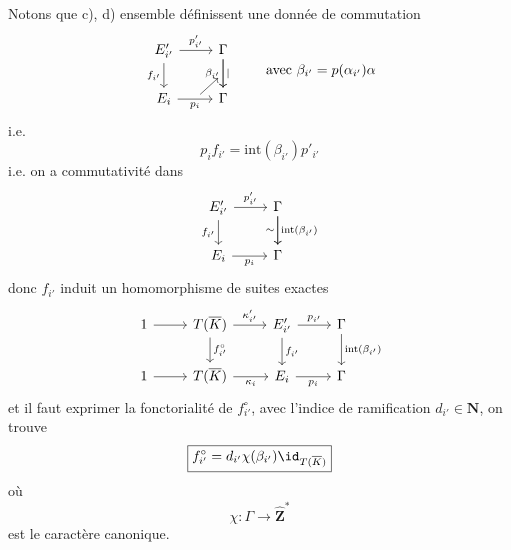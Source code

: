 Notons que c), d) ensemble définissent une donnée de commutation
\[\begin{tikzcd}
	{E'_{i'}} & \Gamma \\
	{E_i} & \Gamma
	\arrow["{f_{i'}}"', from=1-1, to=2-1]
	\arrow["{p'_{i'}}", from=1-1, to=1-2]
	\arrow[""{name=0, anchor=center, inner sep=0}, "{p_i}"', from=2-1, to=2-2]
	\arrow[""{name=1, anchor=center, inner sep=0}, "{\beta_{i'}}"', from=1-2, to=2-2]
	\arrow["\mid", from=1-2, to=2-2]
	\arrow[shorten <=4pt, shorten >=4pt, from=0, to=1]
    \end{tikzcd} \quad\quad ~\text{avec}~\beta_{i'} = p (\alpha_{i'}) \alpha
    \]
i.e.
$$
p_if_{i'} = \text{int}(\beta_{i'})p'_{i'}
$$
i.e. on a commutativité dans
\[\begin{tikzcd}
	{E'_{i'}} & \Gamma \\
	{E_i} & \Gamma
	\arrow["{f_{i'}}"', from=1-1, to=2-1]
	\arrow["{p'_{i'}}", from=1-1, to=1-2]
	\arrow["{p_i}"', from=2-1, to=2-2]
	\arrow["\sim"', from=1-2, to=2-2]
	\arrow["{\text{int}(\beta_{i'})}", from=1-2, to=2-2]
\end{tikzcd}\]
donc $f_{i'}$ induit un homomorphisme de suites exactes
\[\begin{tikzcd}
	1 & {T(\overline{K})} & {E'_{i'}} & \Gamma \\
	1 & {T(\overline{K})} & {E_i} & \Gamma
	\arrow[from=1-1, to=1-2]
	\arrow[from=2-1, to=2-2]
	\arrow["{f^\circ_{i'}}", from=1-2, to=2-2]
	\arrow["{f_{i'}}", from=1-3, to=2-3]
	\arrow["{\text{int}(\beta_{i'})}", from=1-4, to=2-4]
	\arrow["{\kappa'_{i'}}", from=1-2, to=1-3]
	\arrow["{p_{i'}}", from=1-3, to=1-4]
	\arrow["{\kappa_i}"', from=2-2, to=2-3]
	\arrow["{p_i}"', from=2-3, to=2-4]
\end{tikzcd}\]
et il faut exprimer la fonctorialité de $f^{\circ}_{i'}$, avec l'indice de ramification $d_{i'} \in \mathbf{N}$, on trouve
$$
\boxed{f^\circ_{i'} = d_{i'} \chi(\beta_{i'})\id_{T(\overline{K})}}
$$
où
$$
\chi: \Gamma \to \widehat{\mathbf{Z}}^*
$$
est le caractère canonique.


